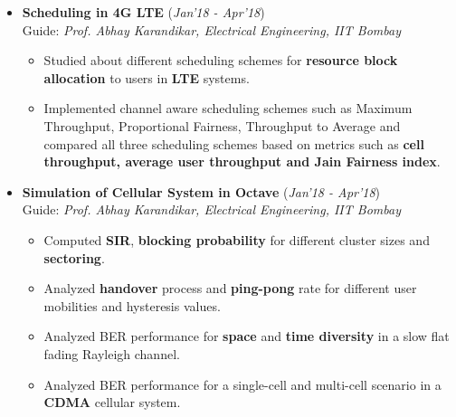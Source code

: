 \documentclass[10pt]{article}
\begin{document}

\colorbox{bl}{}
\vspace{-0.5cm}
\begin{itemize}[leftmargin=0.4cm]


	
\item \textbf{Scheduling in 4G LTE }
\hfill{(\textit{Jan'18 - Apr'18})}\\
Guide: \textit{Prof. Abhay Karandikar, Electrical Engineering, IIT Bombay}\\
\vspace{-0.7cm}
	\begin{itemize}
	\item Studied about different scheduling schemes for \textbf{resource block allocation} to users in \textbf{LTE} systems.\vspace{-0.1cm}
	\item Implemented channel aware scheduling schemes such as Maximum Throughput, Proportional Fairness, Throughput to Average and compared all three scheduling schemes based on metrics such as \textbf{cell throughput, average user throughput and Jain Fairness index}.
    \end{itemize}

	\vspace{-0.25cm}
	
	
\item \textbf{Simulation of Cellular System in Octave}
\hfill{(\textit{Jan'18 - Apr'18})}\\
Guide: \textit{Prof. Abhay Karandikar, Electrical Engineering, IIT Bombay}\\\vspace{-0.7cm}
	\begin{itemize}
	\item Computed \textbf{SIR}, \textbf{blocking probability} for different cluster sizes and \textbf{sectoring}.\vspace{-0.1cm}
	\item Analyzed \textbf{handover} process and \textbf{ping-pong} rate for different user mobilities and hysteresis values.\vspace{-0.1cm}
	\item Analyzed BER performance for \textbf{space} and \textbf{time diversity} in a slow flat fading Rayleigh channel.\vspace{-0.1cm}
	\item Analyzed BER performance for a single-cell and multi-cell scenario in a \textbf{CDMA} cellular system.
    \end{itemize}


\end{itemize}
\end{document}
